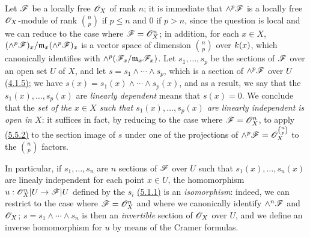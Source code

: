 \begin{env}[5.5.4]
\label{env-0.5.5.4}
Let $\mathscr{F}$ be a locally free $\mathscr{O}_X$ of rank $n$; it is immediate that $\wedge^p\mathscr{F}$ is
a locally free $\mathscr{O}_X$-module of rank $\binom{n}{p}$ if $p\leqslant n$ and $0$ if
$p>n$, since the question is local and we can reduce to the case where $\mathscr{F}=\mathscr{O}_X^n$;
in addition, for each $x\in X$, $(\wedge^p\mathscr{F})_x/\mathfrak{m}_x(\wedge^p\mathscr{F})_x$ is a
vector space of dimension $\binom{n}{p}$ over $k(x)$, which canonically identifies with
$\wedge^p(\mathscr{F}_x/\mathfrak{m}_x\mathscr{F}_x)$. Let $s_1,\dots,s_p$ be the sections of $\mathscr{F}$
over an open set $U$ of $X$, and let $s=s_1\wedge\cdots\wedge s_p$, which is a section of
$\wedge^p\mathscr{F}$ over $U$ \hyperref[env-0.4.1.5]{(4.1.5)}; we have $s(x)=s_1(x)\wedge\cdots\wedge s_p(x)$,
and as a result, we say that the $s_1(x),\dots,s_p(x)$ are {\em linearly dependent} means
that $s(x)=0$. We conclude that the {\em set of the $x\in X$ such that $s_1(x),\dots,s_p(x)$
are linearly independent is open in $X$}: it suffices in fact, by reducing to the case where
$\mathscr{F}=\mathscr{O}_X^n$, to apply \hyperref[env-0.5.5.2]{(5.5.2)} to the section image of $s$ under one of the
projections of $\wedge^p\mathscr{F}=\mathscr{O}_X^{\binom{n}{p}}$ to the $\binom{n}{p}$ factors.

In particular, if $s_1,\dots,s_n$ are $n$ sections of $\mathscr{F}$ over $U$ such that
$s_1(x),\dots,s_n(x)$ are linealy independent for each point $x\in U$, the homomorphism
$u:\mathscr{O}_X^n|U\to\mathscr{F}|U$ defined by the $s_i$ \hyperref[env-0.5.1.1]{(5.1.1)} is an {\em isomorphism}:
indeed, we can restrict to the case where $\mathscr{F}=\mathscr{O}_X^n$ and where we canonically identify
$\wedge^n\mathscr{F}$ and $\mathscr{O}_X$; $s=s_1\wedge\cdots\wedge s_n$ is then an {\em invertible}
section of $\mathscr{O}_X$ over $U$, and we define an inverse homomorphism for $u$ by means of the
Cramer formulas.
\end{env}

